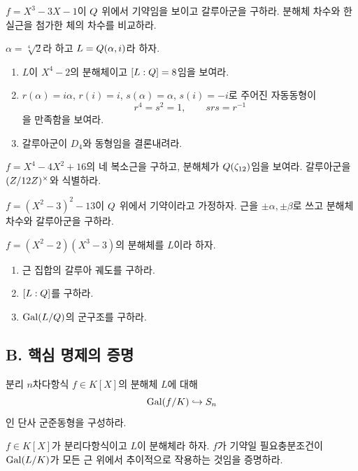 \begin{exercise}
$f=X^3-3X-1$이 $Q$ 위에서 기약임을 보이고 갈루아군을 구하라. 분해체 차수와 한 실근을 첨가한 체의 차수를 비교하라.
\end{exercise}

\begin{exercise}[*]
$\alpha=\sqrt[4]{2}$라 하고 $L=Q(\alpha,i)$라 하자.
\begin{enumerate}[label=(\alph*)]
  \item $L$이 $X^4-2$의 분해체이고 $[L:Q]=8$임을 보여라.
  \item $r(\alpha)=i\alpha$, $r(i)=i$, $s(\alpha)=\alpha$, $s(i)=-i$로 주어진 자동동형이
  \[
    r^4=s^2=1,\qquad srs=r^{-1}
  \]
  을 만족함을 보여라.
  \item 갈루아군이 $D_4$와 동형임을 결론내려라.
\end{enumerate}
\end{exercise}

\begin{exercise}
$f=X^4-4X^2+16$의 네 복소근을 구하고, 분해체가 $Q(\zeta_{12})$임을 보여라. 갈루아군을 $(Z/12Z)^\times$와 식별하라.
\end{exercise}

\begin{exercise}
$f=(X^2-3)^2-13$이 $Q$ 위에서 기약이라고 가정하자. 근을 $\pm\alpha,\pm\beta$로 쓰고 분해체 차수와 갈루아군을 구하라.
\end{exercise}

\begin{exercise}[*]
$f=(X^2-2)(X^3-3)$의 분해체를 $L$이라 하자.
\begin{enumerate}[label=(\alph*)]
  \item 근 집합의 갈루아 궤도를 구하라.
  \item $[L:Q]$를 구하라.
  \item $\operatorname{Gal}(L/Q)$의 군구조를 구하라.
\end{enumerate}
\end{exercise}

\subsection*{B. 핵심 명제의 증명}

\begin{exercise}
분리 $n$차다항식 $f\in K[X]$의 분해체 $L$에 대해
\[
  \operatorname{Gal}(f/K)\hookrightarrow S_n
\]
인 단사 군준동형을 구성하라.
\end{exercise}

\begin{exercise}[*]
$f\in K[X]$가 분리다항식이고 $L$이 분해체라 하자. $f$가 기약일 필요충분조건이 $\operatorname{Gal}(L/K)$가 모든 근 위에서 추이적으로 작용하는 것임을 증명하라.
\end{exercise}

